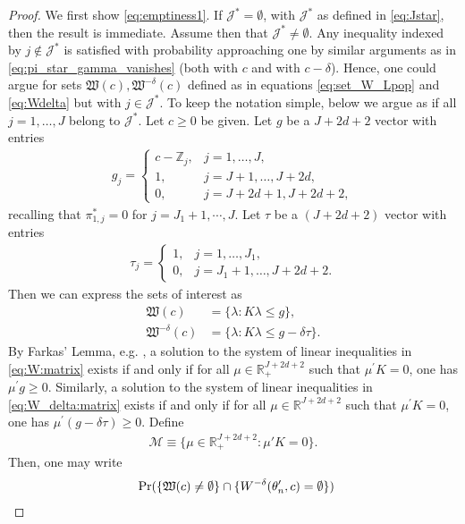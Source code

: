 \documentclass[letterpaper,11pt]{article}
\theoremstyle{myplain}
\theoremstyle{mydefinition}
\theoremstyle{myremark}
\renewcommand{\cite}{\citet}
\newcommand{\HH}{\mathbb{Z}}
\newcommand{\R}{\mathbb{R}}
\newcommand{\cJ}{\mathcal{J}}
\numberwithin{equation}{section}
\numberwithin{figure}{section}
\begin{document}
\begin{appendices}
\begin{proof}
We first show \eqref{eq:emptiness1}. If $\cJ^*=\emptyset$, with $\cJ^*$ as defined in \eqref{eq:Jstar}, then the result is immediate. Assume then that $\cJ^* \neq \emptyset$. Any inequality indexed by $j \notin \cJ^*$ is satisfied with probability approaching one by similar arguments as in \eqref{eq:pi_star_gamma_vanishes} (both with $c$ and with $c-\delta$). Hence, one could argue for sets $\mathfrak W(c),\mathfrak W^{-\delta}(c)$ defined as in equations \eqref{eq:set_W_Lpop} and \eqref{eq:Wdelta} but with $j \in \cJ^*$. To keep the notation simple, below we argue as if all $j=1,\dots,J$ belong to $\cJ^*$.
Let $c \ge 0$ be given. Let $g$ be a $J+2d+2$ vector with entries
\begin{align}
\label{eq:int1}
g_j =\left\{ \begin{array}{lll}
 c - \HH_j, &  j=1,\dots,J,\\
1, &  j=J+1,\dots,J+2d,\\
0, & j=J+2d+1,J+2d+2,
	\end{array} 
	\right. 
\end{align}
recalling that $\pi_{1,j}^*=0$ for $j=J_1+1,\cdots,J$. Let $\tau$ be a $(J+2d+2)$ vector with entries
	\begin{align}
	\label{eq:tau}
	\tau_j = \left\{ \begin{array}{ll}
	1, & j =1,\dots,J_1, \\ 
	0, & j =J_1+1,\dots,J+2d+2.
	\end{array} 
	\right. 
	\end{align}
	Then we can express the sets of interest as
\begin{align}
\mathfrak W(c) &= \{\lambda: K\lambda \le g\},\label{eq:W:matrix}\\
\mathfrak W^{-\delta}(c)&= \{\lambda: K\lambda \le g-\delta \tau\}.\label{eq:W_delta:matrix}
\end{align}
By Farkas' Lemma, e.g. \cite[Theorem 22.1]{Rockafellar1970a}, a solution to the system of linear inequalities in \eqref{eq:W:matrix} exists if and only if for all $\mu \in \R^{J+2d+2}_+$ such that $\mu^{\prime}K=0$, one has $\mu^{\prime}g \ge 0$. Similarly, a solution to the system of linear inequalities in \eqref{eq:W_delta:matrix}
exists if and only if for all $\mu \in \R^{J+2d+2}$ such that $\mu^{\prime}K=0$, one has $\mu^{\prime}(g-\delta \tau) \ge 0$. Define
\begin{align}
	\mathcal M\equiv \{ \mu\in\mathbb R^{J+2d+2}_+:\mu' K=0\}.\label{eq:int3}
\end{align}
Then, one may write
\begin{align}
	&~\Pr(\{\mathfrak W(c)\ne \emptyset \} \cap \{W^{-\delta}(\theta_n^\prime,c)= \emptyset \} )\notag\\
	

\end{align}
\end{proof}
\end{appendices}
\end{document}
